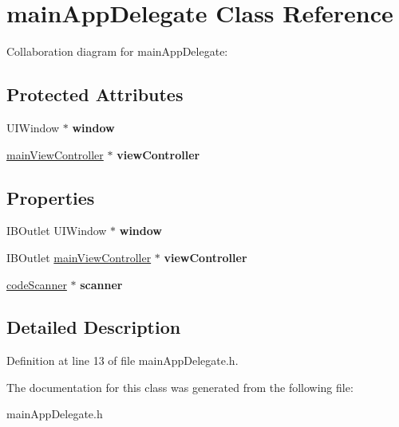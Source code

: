 \hypertarget{interfacemain_app_delegate}{
\section{mainAppDelegate Class Reference}
\label{interfacemain_app_delegate}
}


Collaboration diagram for mainAppDelegate:
\subsection*{Protected Attributes}
\begin{DoxyCompactItemize}
\item 
\hypertarget{interfacemain_app_delegate_a9cfdd8d5a58a043a811ac5af34db51af}{
UIWindow $\ast$ {\bfseries window}}
\label{interfacemain_app_delegate_a9cfdd8d5a58a043a811ac5af34db51af}

\item 
\hypertarget{interfacemain_app_delegate_a53f3ad25ed5c526f2402fa8cbc0b5923}{
\hyperlink{interfacemain_view_controller}{mainViewController} $\ast$ {\bfseries viewController}}
\label{interfacemain_app_delegate_a53f3ad25ed5c526f2402fa8cbc0b5923}

\end{DoxyCompactItemize}
\subsection*{Properties}
\begin{DoxyCompactItemize}
\item 
\hypertarget{interfacemain_app_delegate_a29a6fc1dc60e8f992bc999d19259b0c3}{
IBOutlet UIWindow $\ast$ {\bfseries window}}
\label{interfacemain_app_delegate_a29a6fc1dc60e8f992bc999d19259b0c3}

\item 
\hypertarget{interfacemain_app_delegate_afd47227af0358b615098dced397ce48d}{
IBOutlet \hyperlink{interfacemain_view_controller}{mainViewController} $\ast$ {\bfseries viewController}}
\label{interfacemain_app_delegate_afd47227af0358b615098dced397ce48d}

\item 
\hypertarget{interfacemain_app_delegate_ac5e1230fe023706ddc2fa930e09d2587}{
\hyperlink{interfacecode_scanner}{codeScanner} $\ast$ {\bfseries scanner}}
\label{interfacemain_app_delegate_ac5e1230fe023706ddc2fa930e09d2587}

\end{DoxyCompactItemize}


\subsection{Detailed Description}


Definition at line 13 of file mainAppDelegate.h.



The documentation for this class was generated from the following file:\begin{DoxyCompactItemize}
\item 
mainAppDelegate.h\end{DoxyCompactItemize}
